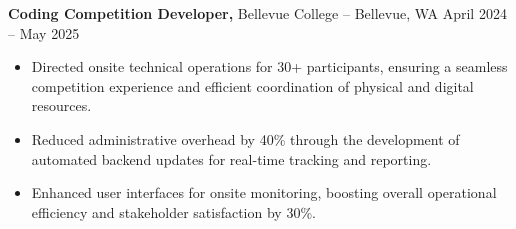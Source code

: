 \documentclass[11pt]{article}       %
\begin{document}

\textbf{Coding Competition Developer,} {Bellevue College} -- Bellevue, WA \hfill April 2024 -- May 2025 \\
\vspace{-9pt}
\begin{itemize}
  \item Directed onsite technical operations for 30+ participants, ensuring a seamless competition experience and efficient coordination of physical and digital resources.
  \item Reduced administrative overhead by 40\% through the development of automated backend updates for real-time tracking and reporting.
  \item Enhanced user interfaces for onsite monitoring, boosting overall operational efficiency and stakeholder satisfaction by 30\%.
\end{itemize}

\end{document}
